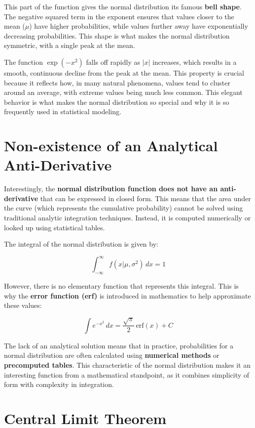 \documentclass[
  12 pt,
  a4paper,
]{book}
\numberwithin{equation}{section}
\theoremstyle{plain}      %
\theoremstyle{definition} %
\theoremstyle{remark}     %
\theoremstyle{note}         %
\begin{document}
This part of the function gives the normal distribution its famous
\textbf{bell shape}. The negative squared term in the exponent ensures
that values closer to the mean (\(\mu\)) have higher probabilities,
while values further away have exponentially decreasing probabilities.
This shape is what makes the normal distribution symmetric, with a
single peak at the mean.

The function \(\exp(-x^2)\) falls off rapidly as \(|x|\) increases,
which results in a smooth, continuous decline from the peak at the mean.
This property is crucial because it reflects how, in many natural
phenomena, values tend to cluster around an average, with extreme values
being much less common. This elegant behavior is what makes the normal
distribution so special and why it is so frequently used in statistical
modeling.

\hypertarget{non-existence-of-an-analytical-anti-derivative}{%
\section{Non-existence of an Analytical
Anti-Derivative}\label{non-existence-of-an-analytical-anti-derivative}}

Interestingly, the \textbf{normal distribution function does not have an
anti-derivative} that can be expressed in closed form. This means that
the area under the curve (which represents the cumulative probability)
cannot be solved using traditional analytic integration techniques.
Instead, it is computed numerically or looked up using statistical
tables.

The integral of the normal distribution is given by:

\[
\int_{-\infty}^{\infty} f(x | \mu, \sigma^2) \, dx = 1
\]

However, there is no elementary function that represents this integral.
This is why the \textbf{error function (erf)} is introduced in
mathematics to help approximate these values:

\[
\int e^{-x^2} \, dx = \frac{\sqrt{\pi}}{2} \, \text{erf}(x) + C
\]

The lack of an analytical solution means that in practice, probabilities
for a normal distribution are often calculated using \textbf{numerical
methods} or \textbf{precomputed tables}. This characteristic of the
normal distribution makes it an interesting function from a mathematical
standpoint, as it combines simplicity of form with complexity in
integration.

\hypertarget{central-limit-theorem}{%
\section{Central Limit Theorem}\label{central-limit-theorem}}
\end{document}
